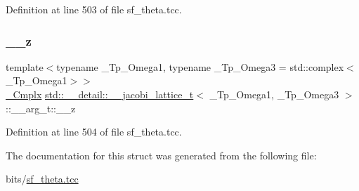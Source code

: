 Definition at line 503 of file sf\+\_\+theta.\+tcc.

\mbox{\label{structstd_1_1____detail_1_1____jacobi__lattice__t_1_1____arg__t_a1d6bd69438f1be3c303c018cb2a8677a}} 
\subsubsection{\texorpdfstring{\+\_\+\+\_\+z}{\_\_z}}
{\footnotesize\ttfamily template$<$typename \+\_\+\+Tp\+\_\+\+Omega1, typename \+\_\+\+Tp\+\_\+\+Omega3 = std\+::complex$<$\+\_\+\+Tp\+\_\+\+Omega1$>$$>$ \\
\hyperlink{structstd_1_1____detail_1_1____jacobi__lattice__t_a77e286c37544d6ba5e4fb5542d3aad5f}{\+\_\+\+Cmplx} \hyperlink{structstd_1_1____detail_1_1____jacobi__lattice__t}{std\+::\+\_\+\+\_\+detail\+::\+\_\+\+\_\+jacobi\+\_\+lattice\+\_\+t}$<$ \+\_\+\+Tp\+\_\+\+Omega1, \+\_\+\+Tp\+\_\+\+Omega3 $>$\+::\+\_\+\+\_\+arg\+\_\+t\+::\+\_\+\+\_\+z}



Definition at line 504 of file sf\+\_\+theta.\+tcc.



The documentation for this struct was generated from the following file\+:\begin{DoxyCompactItemize}
\item 
bits/\hyperlink{sf__theta_8tcc}{sf\+\_\+theta.\+tcc}\end{DoxyCompactItemize}
